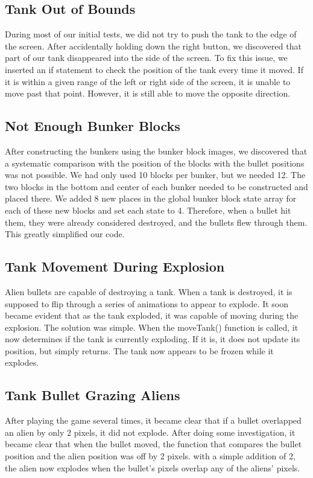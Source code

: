 \documentclass[11pt,letter,oneside]{report}
\begin{document}
\subsection{Tank Out of Bounds}
During most of our initial tests, we did not try to push the tank to the edge of the screen. After accidentally holding down the right button, we discovered that part of our tank disappeared into the side of the screen. To fix this issue, we inserted an if statement to check the position of the tank every time it moved. If it is within a given range of the left or right side of the screen, it is unable to move past that point. However, it is still able to move the opposite direction.

\subsection{Not Enough Bunker Blocks}
After constructing the bunkers using the bunker block images, we discovered that a systematic comparison with the position of the blocks with the bullet positions was not possible. We had only used 10 blocks per bunker, but we needed 12. The two blocks in the bottom and center of each bunker needed to be constructed and placed there. We added 8 new places in the global bunker block state array for each of these new blocks and set each state to 4. Therefore, when a bullet hit them, they were already considered destroyed, and the bullets flew through them. This greatly simplified our code.

\subsection{Tank Movement During Explosion}
Alien bullets are capable of destroying a tank. When a tank is destroyed, it is supposed to flip through a series of animations to appear to explode. It soon became evident that as the tank exploded, it was capable of moving during the explosion. The solution was simple. When the moveTank() function is called, it now determines if the tank is currently exploding. If it is, it does not update its position, but simply returns. The tank now appears to be frozen while it explodes.

\subsection{Tank Bullet Grazing Aliens}
After playing the game several times, it became clear that if a bullet overlapped an alien by only 2 pixels, it did not explode. After doing some investigation, it became clear that when the bullet moved, the function that compares the bullet position and the alien position was off by 2 pixels. with a simple addition of 2, the alien now explodes when the bullet's pixels overlap any of the aliens' pixels.
\end{document}

